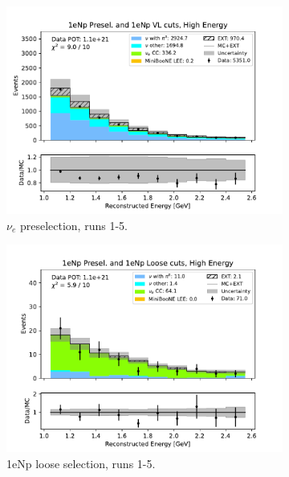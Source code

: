\begin{figure}[H]
\begin{subfigure}{0.33\linewidth}
    \includegraphics[width=\linewidth]{technote/Sidebands/Figures/FarSideband/far_sideband_reco_e_run1234b4c4d5_NP_NP_HIGH_ENERGY.pdf}
    \caption{$\nu_e$ preselection, runs 1-5.}
    \end{subfigure}%
    \begin{subfigure}{0.33\linewidth}
    \includegraphics[width=\linewidth]{technote/Sidebands/Figures/FarSideband/far_sideband_reco_e_run1234b4c4d5_NP_NPL_HIGH_ENERGY.pdf}
    \caption{1eNp loose selection, runs 1-5.}
    \end{subfigure}%
    \begin{subfigure}{0.33\linewidth}

\end{subfigure}
\end{figure}
